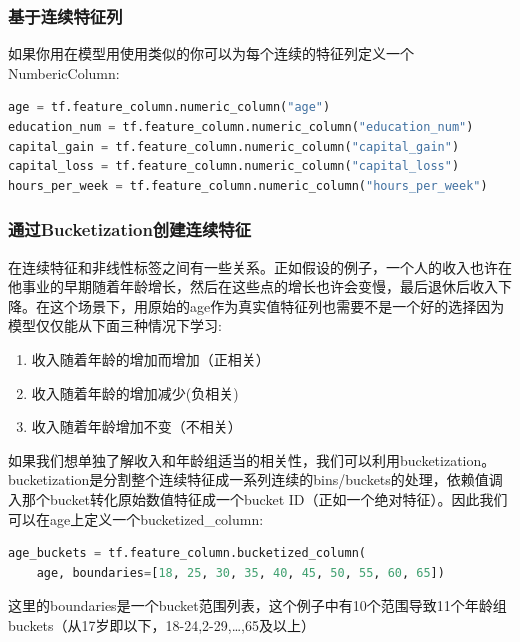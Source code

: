 \subsubsection{基于连续特征列}
如果你用在模型用使用类似的你可以为每个连续的特征列定义一个NumbericColumn:
\begin{lstlisting}[language=Python]
age = tf.feature_column.numeric_column("age")
education_num = tf.feature_column.numeric_column("education_num")
capital_gain = tf.feature_column.numeric_column("capital_gain")
capital_loss = tf.feature_column.numeric_column("capital_loss")
hours_per_week = tf.feature_column.numeric_column("hours_per_week")
\end{lstlisting}
\subsubsection{通过Bucketization创建连续特征}
在连续特征和非线性标签之间有一些关系。正如假设的例子，一个人的收入也许在他事业的早期随着年龄增长，然后在这些点的增长也许会变慢，最后退休后收入下降。在这个场景下，用原始的age作为真实值特征列也需要不是一个好的选择因为模型仅仅能从下面三种情况下学习:
\begin{enumerate}
\item 收入随着年龄的增加而增加（正相关）
\item 收入随着年龄的增加减少(负相关)
\item 收入随着年龄增加不变（不相关）
\end{enumerate}
如果我们想单独了解收入和年龄组适当的相关性，我们可以利用bucketization。bucketization是分割整个连续特征成一系列连续的bins/buckets的处理，依赖值调入那个bucket转化原始数值特征成一个bucket ID（正如一个绝对特征）。因此我们可以在age上定义一个bucketized\_column:
\begin{lstlisting}[language=Python]
age_buckets = tf.feature_column.bucketized_column(
    age, boundaries=[18, 25, 30, 35, 40, 45, 50, 55, 60, 65])
\end{lstlisting}
这里的boundaries是一个bucket范围列表，这个例子中有10个范围导致11个年龄组buckets（从17岁即以下，18-24,2-29,\ldots,65及以上）
